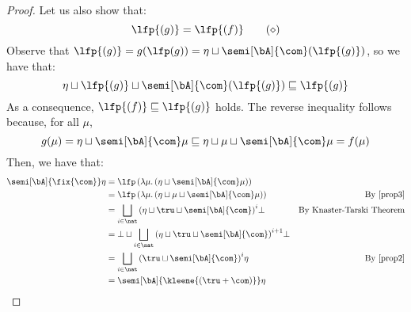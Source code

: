 \begin{proof}
  Let us also show that:
  \begin{equation}\label{prop3}
    \lfp{(g)} = \lfp{(f)}\tag{\(\diamond\)}
  \end{equation}
  Observe that
  \(\lfp{(g)} = g(\lfp(g)) = \eta \sqcup
  \semi[\bA]{\com}(\lfp{(g)})\), so we have that:
  \[
    \eta \sqcup \lfp{(g)} \sqcup \semi[\bA]{\com}(\lfp{(g)})
    \sqsubseteq \lfp{(g)}
  \]
  As a consequence, \(\lfp{(f)}\sqsubseteq \lfp{(g)}\) holds. The
  reverse inequality follows because, for all \(\mu\),
  \begin{equation*}
    g(\mu) = \eta \sqcup \semi[\bA]{\com} \mu \sqsubseteq \eta \sqcup \mu \sqcup \semi[\bA]{\com} \mu = f(\mu)
  \end{equation*}
  Then, we have that:
  \begin{align*}
    \semi[\bA]{\fix{\com}} \eta & = \lfp\left({\lambda \mu. \left(\eta \sqcup \semi[\bA]{\com} \mu\right)}\right) \\
    & = \lfp\left({\lambda \mu. \left(\eta \sqcup \mu \sqcup \semi[\bA]{\com} \mu\right)}\right) &  \text{By~\eqref{prop3}}\\
    & = \bigsqcup_{i \in \nat} {\left(\eta \sqcup \tru \sqcup \semi[\bA]{\com}\right)}^i \bot & \text{By Knaster-Tarski Theorem} \\
    & = \bot \sqcup \bigsqcup_{i \in \nat} {\left(\eta \sqcup \tru \sqcup \semi[\bA]{\com}\right)}^{i+1} \bot \\
    & = \bigsqcup_{i \in \nat} {\left(\tru \sqcup \semi[\bA]{\com}\right)}^{i} \eta & \text{By~\eqref{prop2}}\\
    & = \semi[\bA]{\kleene{\left(\tru + \com\right)}} \eta
  \end{align*}  
\end{proof}
